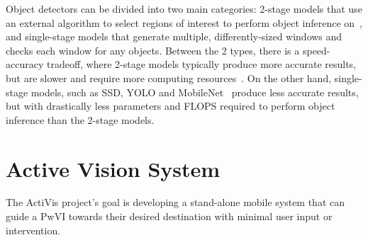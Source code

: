 \documentclass[runningheads]{llncs}
\begin{document}
Object detectors can be divided into two main categories: 2-stage models that use an external algorithm to select regions of interest to perform object inference on~\cite{ren2015faster}, and single-stage models that generate multiple, differently-sized windows and checks each window for any objects.
Between the 2 types, there is a speed-accuracy tradeoff, where 2-stage models typically produce more accurate results, but are slower and require more computing resources~\cite{liu2018deeplf}.
On the other hand, single-stage models, such as SSD, YOLO and MobileNet~\cite{liu2016ssd,redmon2018yolo,howard2017mobilenet} produce less accurate results, but with drastically less parameters and FLOPS required to perform object inference than the 2-stage models. 

\section{Active Vision System}\label{sec:active-vision}

The ActiVis project's goal is developing a stand-alone mobile system that can guide a PwVI towards their desired destination with minimal user input or intervention. 
\end{document}
